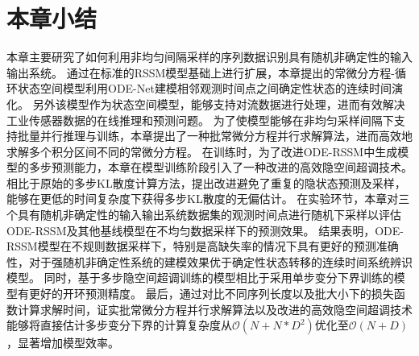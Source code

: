 



\section{本章小结}
\label{sec:5_conclusion}
本章主要研究了如何利用非均匀间隔采样的序列数据识别具有随机非确定性的输入输出系统。
通过在标准的RSSM模型基础上进行扩展，本章提出的常微分方程-循环状态空间模型利用ODE-Net建模相邻观测时间点之间确定性状态的连续时间演化。
另外该模型作为状态空间模型，能够支持对流数据进行处理，进而有效解决工业传感器数据的在线推理和预测问题。
为了使模型能够在非均匀采样间隔下支持批量并行推理与训练，本章提出了一种批常微分方程并行求解算法，进而高效地求解多个积分区间不同的常微分方程。
在训练时，为了改进ODE-RSSM中生成模型的多步预测能力，本章在模型训练阶段引入了一种改进的高效隐空间超调技术。
相比于原始的多步KL散度计算方法，提出改进避免了重复的隐状态预测及采样，能够在更低的时间复杂度下获得多步KL散度的无偏估计。
在实验环节，本章对三个具有随机非确定性的输入输出系统数据集的观测时间点进行随机下采样以评估ODE-RSSM及其他基线模型在不均匀数据采样下的预测效果。
结果表明，ODE-RSSM模型在不规则数据采样下，特别是高缺失率的情况下具有更好的预测准确性，对于强随机非确定性系统的建模效果优于确定性状态转移的连续时间系统辨识模型。
同时，基于多步隐空间超调训练的模型相比于采用单步变分下界训练的模型有更好的开环预测精度。
最后，通过对比不同序列长度以及批大小下的损失函数计算求解时间，证实批常微分方程并行求解算法以及改进的高效隐空间超调技术能够将直接估计多步变分下界的计算复杂度从$\mathcal{O}(N+N*D^2)$优化至$\mathcal{O}(N+D)$，显著增加模型效率。

